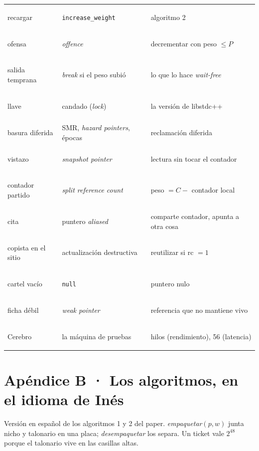 {\begin{longtable}{@{}>{\itshape\raggedright}p{2.5cm} >{\raggedright}p{2.7cm} >{\raggedright\arraybackslash}p{5.4cm}@{}}
recargar & \texttt{increase\_weight} & algoritmo 2 \\
ofensa & \emph{offence} & decrementar con peso $\leq P$ \\
salida temprana & \emph{break} si el peso subió & lo que lo hace \emph{wait-free} \\
llave & candado (\emph{lock}) & la versión de libstdc++ \\
basura diferida & SMR, \emph{hazard pointers}, épocas & reclamación diferida \\
vistazo & \emph{snapshot pointer} & lectura sin tocar el contador \\
contador partido & \emph{split reference count} & peso $= C -$ contador local \\
cita & puntero \emph{aliased} & comparte contador, apunta a otra cosa \\
copista en el sitio & actualización destructiva & reutilizar si rc $=1$ \\
cartel vacío & \texttt{null} & puntero nulo \\
ficha débil & \emph{weak pointer} & referencia que no mantiene vivo \\
Cerebro & la máquina de pruebas & 144 hilos (rendimiento), 56 (latencia) \\
\bottomrule
\end{longtable}
}

\chapter{Apéndice B · Los algoritmos, en el idioma de Inés}

\noindent Versión en español de los algoritmos 1 y 2 del paper. \textit{empaquetar}$(p,w)$ junta nicho y talonario en una placa; \textit{desempaquetar} los separa. Un ticket vale $2^{48}$ porque el talonario vive en las casillas altas.

